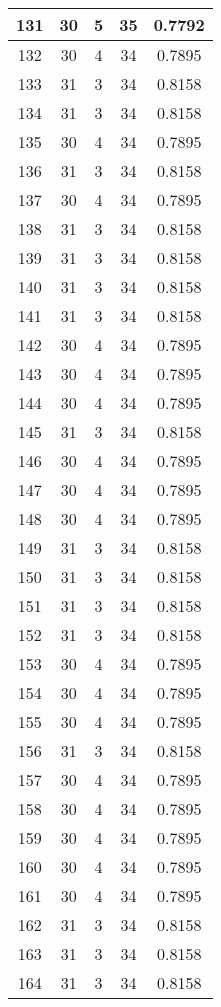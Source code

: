 \documentclass[letterpaper, 12pt]{article}
\begin{document}
\begin{longtable}{|c|c|c|c|c|}
\hline
131 & 30 & 5 & 35 & 0.7792 \\
\hline
132 & 30 & 4 & 34 & 0.7895 \\
\hline
133 & 31 & 3 & 34 & 0.8158 \\
\hline
134 & 31 & 3 & 34 & 0.8158 \\
\hline
135 & 30 & 4 & 34 & 0.7895 \\
\hline
136 & 31 & 3 & 34 & 0.8158 \\
\hline
137 & 30 & 4 & 34 & 0.7895 \\
\hline
138 & 31 & 3 & 34 & 0.8158 \\
\hline
139 & 31 & 3 & 34 & 0.8158 \\
\hline
140 & 31 & 3 & 34 & 0.8158 \\
\hline
141 & 31 & 3 & 34 & 0.8158 \\
\hline
142 & 30 & 4 & 34 & 0.7895 \\
\hline
143 & 30 & 4 & 34 & 0.7895 \\
\hline
144 & 30 & 4 & 34 & 0.7895 \\
\hline
145 & 31 & 3 & 34 & 0.8158 \\
\hline
146 & 30 & 4 & 34 & 0.7895 \\
\hline
147 & 30 & 4 & 34 & 0.7895 \\
\hline
148 & 30 & 4 & 34 & 0.7895 \\
\hline
149 & 31 & 3 & 34 & 0.8158 \\
\hline
150 & 31 & 3 & 34 & 0.8158 \\
\hline
151 & 31 & 3 & 34 & 0.8158 \\
\hline
152 & 31 & 3 & 34 & 0.8158 \\
\hline
153 & 30 & 4 & 34 & 0.7895 \\
\hline
154 & 30 & 4 & 34 & 0.7895 \\
\hline
155 & 30 & 4 & 34 & 0.7895 \\
\hline
156 & 31 & 3 & 34 & 0.8158 \\
\hline
157 & 30 & 4 & 34 & 0.7895 \\
\hline
158 & 30 & 4 & 34 & 0.7895 \\
\hline
159 & 30 & 4 & 34 & 0.7895 \\
\hline
160 & 30 & 4 & 34 & 0.7895 \\
\hline
161 & 30 & 4 & 34 & 0.7895 \\
\hline
162 & 31 & 3 & 34 & 0.8158 \\
\hline
163 & 31 & 3 & 34 & 0.8158 \\
\hline
164 & 31 & 3 & 34 & 0.8158 \\

\end{longtable}
\end{document}
